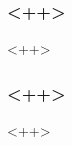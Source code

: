 
\begin{frame}[ctb!]
  \frametitle{<++>}
\footnotesize{
  <++>
}
\end{frame}

\begin{frame}[ctb!]
  \frametitle{<++>}
\footnotesize{
  <++>
}
\end{frame}
